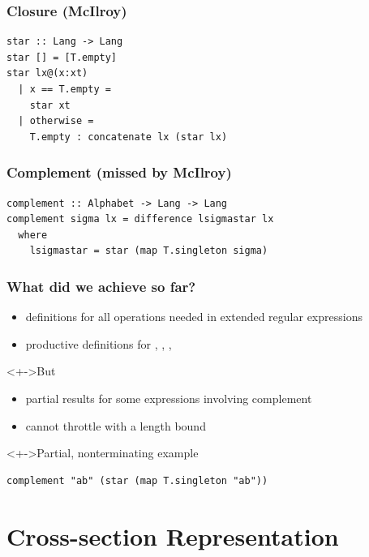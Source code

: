 \documentclass[pdftex,aspectratio=169]{beamer}
\begin{document}
\begin{frame}
  \frametitle{Closure (McIlroy)}
\begin{lstlisting}[numbers=none]
star :: Lang -> Lang
star [] = [T.empty]
star lx@(x:xt)
  | x == T.empty =
    star xt
  | otherwise =
    T.empty : concatenate lx (star lx)
\end{lstlisting}
\end{frame}

\begin{frame}[fragile]
  \frametitle{Complement (missed by McIlroy)}
\begin{lstlisting}[numbers=none]
complement :: Alphabet -> Lang -> Lang
complement sigma lx = difference lsigmastar lx
  where
    lsigmastar = star (map T.singleton sigma)
\end{lstlisting}
\end{frame}

\begin{frame}[fragile]
  \frametitle{What did we achieve so far?}
  \begin{itemize}
  \item<+-> definitions for all operations needed in extended regular expressions
  \item<+-> productive definitions for ,
    , , 
  \end{itemize}
  \begin{block}<+->{But}
    \begin{itemize}
    \item partial results for some expressions involving complement
    \item cannot throttle with a length bound
    \end{itemize}
  \end{block}
  \begin{exampleblock}<+->{Partial, nonterminating example}
\begin{lstlisting}[numbers=none]
complement "ab" (star (map T.singleton "ab"))
\end{lstlisting}
  \end{exampleblock}
\end{frame}

\section{Cross-section Representation}
\end{document}
